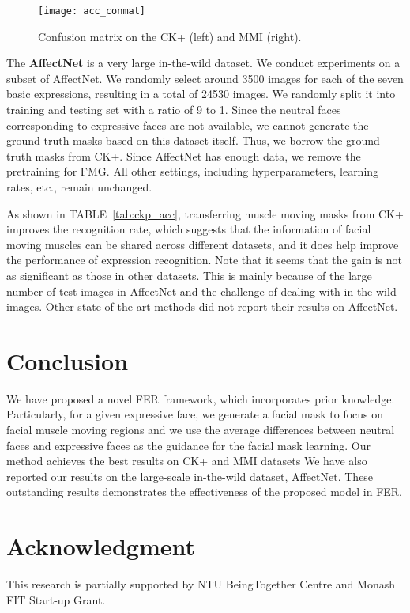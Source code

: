 \documentclass[conference,a4paper]{IEEEtran}
\begin{document}
\begin{figure}[t!]
    \centering
    \texttt{[image: acc\_conmat]}
    \caption{Confusion matrix on the CK+ (left) and MMI (right).} \label{fig:acc_conmat}
\end{figure}

The \textbf{AffectNet} \cite{mollahosseini2017affectnet} is a very large in-the-wild dataset.
We conduct experiments on a subset of AffectNet. We randomly select around 3500 images for each of the seven basic expressions, resulting in a total of 24530 images. We randomly split it into training and testing set with a ratio of 9 to 1. Since the neutral faces corresponding to expressive faces are not available, we cannot generate the ground truth masks based on this dataset itself. 
Thus, we borrow the ground truth masks from CK+. Since AffectNet has enough data, we remove the pretraining for FMG. All other settings, including hyperparameters, learning rates, etc., remain unchanged.

As shown in TABLE~\ref{tab:ckp_acc}, transferring muscle moving masks from CK+ improves the recognition rate, which suggests that the information of facial moving muscles can be shared across different datasets, and it does help improve the performance of expression recognition. Note that it seems that the gain is not as significant as those in other datasets. This is mainly because of the large number of test images in AffectNet and the challenge of dealing with in-the-wild images. Other state-of-the-art methods did not report their results on AffectNet. 









\section{Conclusion}
We have proposed a novel FER framework, which incorporates prior knowledge. Particularly, for a given expressive face, we generate a facial mask to focus on facial muscle moving regions and we use the average differences between neutral faces and expressive faces as the guidance for the facial mask learning. Our method achieves the best results on CK+ and MMI datasets We have also reported our results on the large-scale in-the-wild dataset, AffectNet. These outstanding results demonstrates the effectiveness of the proposed model in FER.





\section*{Acknowledgment}
This research is partially supported by NTU BeingTogether Centre and Monash FIT Start-up Grant.













\end{document}
